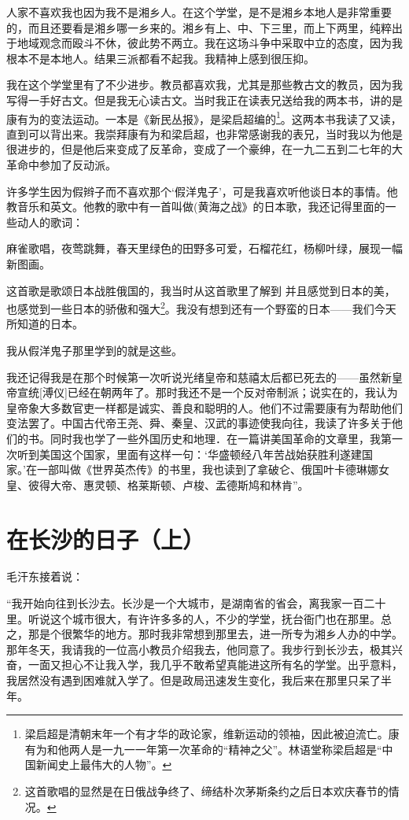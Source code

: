 \documentclass[10pt]{book}
\begin{document}
人家不喜欢我也因为我不是湘乡人。在这个学堂，是不是湘乡本地人是非常重要的，而且还要看是湘乡哪一乡来的。湘乡有上、中、下三里，而上下两里，纯粹出于地域观念而殴斗不休，彼此势不两立。我在这场斗争中采取中立的态度，因为我根本不是本地人。结果三派都看不起我。我精神上感到很压抑。

我在这个学堂里有了不少进步。教员都喜欢我，尤其是那些教古文的教员，因为我写得一手好古文。但是我无心读古文。当时我正在读表兄送给我的两本书，讲的是康有为的变法运动。一本是《新民丛报》，是梁启超编的\footnote{梁启超是清朝末年一个有才华的政论家，维新运动的领袖，因此被迫流亡。康有为和他两人是一九一一年第一次革命的“精神之父”。林语堂称梁启超是“中国新闻史上最伟大的人物”。}。这两本书我读了又读，直到可以背出来。我崇拜康有为和梁启超，也非常感谢我的表兄，当时我以为他是很进步的，但是他后来变成了反革命，变成了一个豪绅，在一九二五到二七年的大革命中参加了反动派。

许多学生因为假辫子而不喜欢那个‘假洋鬼子’，可是我喜欢听他谈日本的事情。他教音乐和英文。他教的歌中有一首叫做(黄海之战》的日本歌，我还记得里面的一些动人的歌词：

麻雀歌唱，夜莺跳舞，春天里绿色的田野多可爱，石榴花红，杨柳叶绿，展现一幅新图画。

这首歌是歌颂日本战胜俄国的，我当时从这首歌里了解到 并且感觉到日本的美，也感觉到一些日本的骄傲和强大\footnote{这首歌唱的显然是在日俄战争终了、缔结朴次茅斯条约之后日本欢庆春节的情况。}。我没有想到还有一个野蛮的日本——我们今天所知道的日本。

我从假洋鬼子那里学到的就是这些。

我还记得我是在那个时候第一次听说光绪皇帝和慈禧太后都已死去的——虽然新皇帝宣统[溥仪]已经在朝两年了。那时我还不是一个反对帝制派；说实在的，我认为皇帝象大多数官吏一样都是诚实、善良和聪明的人。他们不过需要康有为帮助他们变法罢了。中国古代帝王尧、舜、秦皇、汉武的事迹使我向往，我读了许多关于他们的书。同时我也学了一些外国历史和地理．在一篇讲美国革命的文章里，我第一次听到美国这个国家，里面有这样一句：‘华盛顿经八年苦战始获胜利遂建国家。’在一部叫做《世界英杰传》的书里，我也读到了拿破仑、俄国叶卡德琳娜女皇、彼得大帝、惠灵顿、格莱斯顿、卢梭、盂德斯鸠和林肯”。




\section{在长沙的日子（上）}

毛汗东接着说：

“我开始向往到长沙去。长沙是一个大城市，是湖南省的省会，离我家一百二十里。听说这个城市很大，有许许多多的人，不少的学堂，抚台衙门也在那里。总之，那是个很繁华的地方。那时我非常想到那里去，进一所专为湘乡人办的中学。那年冬天，我请我的一位高小教员介绍我去，他同意了。我步行到长沙去，极其兴奋，一面又担心不让我入学，我几乎不敢希望真能进这所有名的学堂。出乎意料，我居然没有遇到困难就入学了。但是政局迅速发生变化，我后来在那里只呆了半年。
\end{document}
